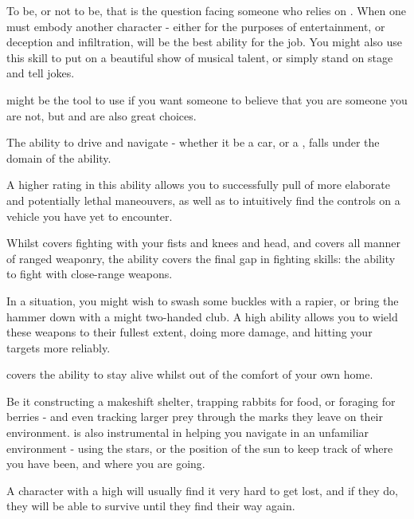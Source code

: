 
To be, or not to be, that is the question facing someone who relies on . When one must embody another character - either for the purposes of entertainment, or deception and infiltration,  will be the best ability for the job. You might also use this skill to put on a beautiful show of musical talent, or simply stand on stage and tell jokes. 

 might be the tool to use if you want someone to believe that you are someone you are not, but   and  are also great choices. 


The ability to drive and navigate - whether it be a  car, or a , falls under the domain of the  ability. 

A higher rating in this ability allows you to successfully pull of more elaborate and potentially lethal maneouvers, as well as to intuitively find the controls on a vehicle you have yet to encounter. 


Whilst  covers fighting with your fists and knees and head, and  covers all manner of ranged weaponry, the  ability covers the final gap in fighting skills: the ability to fight with close-range weapons. 

In a  situation, you might wish to swash some buckles with a rapier, or bring the hammer down with a might two-handed club. A high  ability allows you to wield these weapons to their fullest extent, doing more damage, and hitting your targets more reliably.


 covers the ability to stay alive whilst out of the comfort of your own home. 

Be it constructing a makeshift shelter, trapping rabbits for food, or foraging for berries - and even tracking larger prey through the marks they leave on their environment.  is also instrumental in helping you navigate in an unfamiliar environment - using the stars, or the position of the sun to keep track of where you have been, and where you are going. 

A character with a high  will usually find it very hard to get lost, and if they do, they will be able to survive until they find their way again. 


